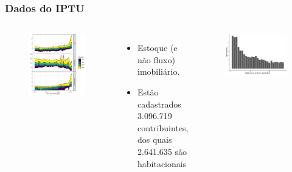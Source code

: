 \documentclass[%
    9pt, 
    aspectratio=169,
]{beamer}
\begin{document}
\begin{frame}
    \frametitle{Dados do IPTU}
    \begin{columns}
        \begin{figure}
            \centering
            \includegraphics[height = .9\textheight]{imagens/indicadores_tempo_small.pdf}
        \end{figure}

        \begin{itemize}
            \item Estoque (e não fluxo) imobiliário.
            \item Estão cadastrados 3.096.719 contribuintes, dos quais \textcolor{BrickRed}{2.641.635} são habitacionais
        \end{itemize}

        \begin{figure}
            \centering
            \includegraphics[width = .8\textwidth]{imagens/verticalizacao.pdf}
        \end{figure}
    \end{columns}
    
\end{frame}
\end{document}
